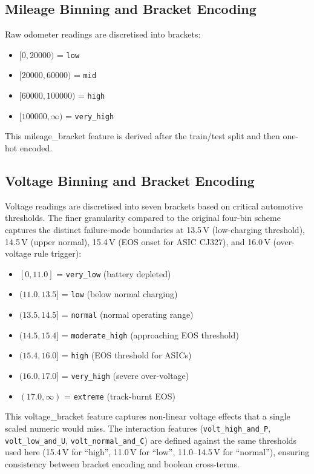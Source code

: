 \documentclass[10pt]{article}
\begin{document}
\subsection{Mileage Binning and Bracket Encoding}

Raw odometer readings are discretised into brackets:

\begin{itemize}
    \item \([0, 20000)\) = \texttt{low}
    \item \([20000, 60000)\) = \texttt{mid}
    \item \([60000, 100000)\) = \texttt{high}
    \item \([100000, \infty)\) = \texttt{very\_high}
\end{itemize}

This mileage\_bracket feature is derived after the train/test split and then one-hot encoded.

\subsection{Voltage Binning and Bracket Encoding}

Voltage readings are discretised into seven brackets based on critical automotive thresholds. The finer granularity compared to the original four-bin scheme captures the distinct failure-mode boundaries at 13.5\,V (low-charging threshold), 14.5\,V (upper normal), 15.4\,V (EOS onset for ASIC CJ327), and 16.0\,V (over-voltage rule trigger):

\begin{itemize}
    \item \([0, 11.0]\) = \texttt{very\_low} (battery depleted)
    \item \((11.0, 13.5]\) = \texttt{low} (below normal charging)
    \item \((13.5, 14.5]\) = \texttt{normal} (normal operating range)
    \item \((14.5, 15.4]\) = \texttt{moderate\_high} (approaching EOS threshold)
    \item \((15.4, 16.0]\) = \texttt{high} (EOS threshold for ASICs)
    \item \((16.0, 17.0]\) = \texttt{very\_high} (severe over-voltage)
    \item \((17.0, \infty)\) = \texttt{extreme} (track-burnt EOS)
\end{itemize}

This voltage\_bracket feature captures non-linear voltage effects that a single scaled numeric would miss. The interaction features (\texttt{volt\_high\_and\_P}, \texttt{volt\_low\_and\_U}, \texttt{volt\_normal\_and\_C}) are defined against the same thresholds used here (15.4\,V for ``high'', 11.0\,V for ``low'', 11.0--14.5\,V for ``normal''), ensuring consistency between bracket encoding and boolean cross-terms.
\end{document}
